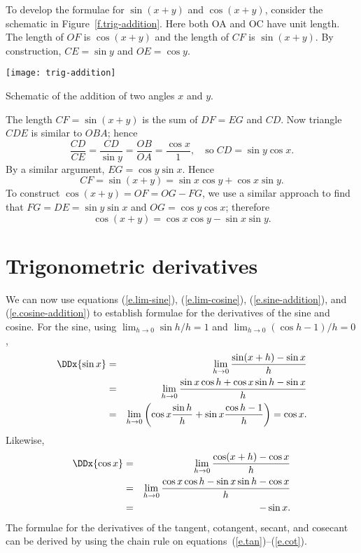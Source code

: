 To develop the formulae for $\sin(x+y)$ and $\cos(x+y)$, consider the schematic in Figure~\ref{f.trig-addition}. Here both OA and OC have unit length. The length of $OF$ is $\cos(x+y)$ and the length of $CF$ is $\sin(x+y)$.  By construction, $CE = \sin y$ and $OE = \cos y$.

\begin{marginfigure}
\texttt{[image: trig-addition]}
\caption[Schematic of the addition of two angles]{Schematic of the addition of two angles $x$ and $y$.}
\label{f.trig-addition}
\end{marginfigure}

The length $CF = \sin(x+y)$ is the sum of $DF = EG$ and $CD$.  Now triangle $CDE$ is similar to $OBA$; hence
\[ 
	\frac{CD}{CE} = \frac{CD}{\sin y} = \frac{OB}{OA} = \frac{\cos x}{1},\quad\textrm{so}
	\;CD = \sin y\cos x. 
\]
By a similar argument, $EG = \cos y \sin x$.  Hence
\begin{equation}\label{e.sine-addition}
	CF = \sin(x + y) = \sin x\cos y + \cos x\sin y.
\end{equation}
To construct $\cos(x+y) = OF = OG-FG$, we use a similar approach to find that $FG = DE = \sin y \sin x$ and $OG = \cos y \cos x$; therefore
\begin{equation}\label{e.cosine-addition}
	\cos(x+y) = \cos x \cos y - \sin x\sin y.
\end{equation}

\section{Trigonometric derivatives}

We can now use equations (\ref{e.lim-sine}), (\ref{e.lim-cosine}), (\ref{e.sine-addition}), and (\ref{e.cosine-addition}) to establish formulae for the derivatives of the sine and cosine.  For the sine, using $\lim_{h\to 0}\sin h/h = 1$ and $\lim_{h\to 0}(\cos h - 1)/h = 0$,
\begin{eqnarray}
	\DDx{\sin x} &=& \lim_{h\to 0}\frac{\sin(x+h)-\sin x}{h}\nonumber\\
		&=& \lim_{h\to 0}\frac{\sin x\cos h + \cos x \sin h - \sin x}{h}\nonumber\\
		&=& \lim_{h\to0}\left(\cos x\frac{\sin h}{h} + \sin x\frac{\cos h-1}{h}\right) = \cos x. \label{e.dsin}
\end{eqnarray}
Likewise,
\begin{eqnarray}
	\DDx{\cos x} &=& \lim_{h\to 0}\frac{\cos(x+h)-\cos x}{h}\nonumber\\
		&=& \lim_{h\to 0}\frac{\cos x\cos h - \sin x \sin h - \cos x}{h}\nonumber\\
		&=& -\sin x. \label{e.dcos}
\end{eqnarray}
The formulae for the derivatives of the tangent, cotangent, secant, and cosecant can be derived by using the chain rule on equations~(\ref{e.tan})--(\ref{e.cot}).

